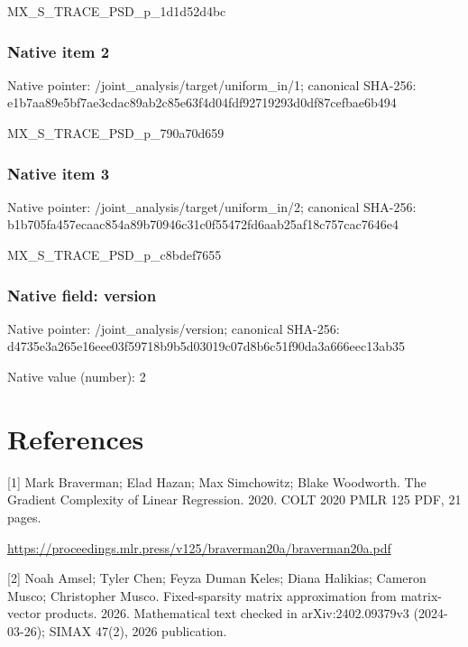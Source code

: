 \documentclass[10pt,a4paper]{article}
\begin{document}
\begingroup\raggedright\sloppy MX\_\allowbreak{}S\_\allowbreak{}TRACE\_\allowbreak{}PSD\_\allowbreak{}p\_\allowbreak{}1d1d52d4bc\par\endgroup

\subsubsection{Native item 2}
Native pointer: /joint\_\allowbreak{}analysis/target/uniform\_\allowbreak{}in/1; canonical SHA-256: e1b7aa89e5bf7ae3cdac89ab2c85e63f4d04fdf92719293d0df87cefbae6b494

\begingroup\raggedright\sloppy MX\_\allowbreak{}S\_\allowbreak{}TRACE\_\allowbreak{}PSD\_\allowbreak{}p\_\allowbreak{}790a70d659\par\endgroup

\subsubsection{Native item 3}
Native pointer: /joint\_\allowbreak{}analysis/target/uniform\_\allowbreak{}in/2; canonical SHA-256: b1b705fa457ecaac854a89b70946c31c0f55472fd6aab25af18c757cac7646e4

\begingroup\raggedright\sloppy MX\_\allowbreak{}S\_\allowbreak{}TRACE\_\allowbreak{}PSD\_\allowbreak{}p\_\allowbreak{}c8bdef7655\par\endgroup

\subsubsection{Native field: version}
Native pointer: /joint\_\allowbreak{}analysis/version; canonical SHA-256: d4735e3a265e16eee03f59718b9b5d03019c07d8b6c51f90da3a666eec13ab35

Native value (number): 2

\section{References}
[1] Mark Braverman; Elad Hazan; Max Simchowitz; Blake Woodworth. The Gradient Complexity of Linear Regression. 2020. COLT 2020 PMLR 125 PDF, 21 pages.

\url{https://proceedings.mlr.press/v125/braverman20a/braverman20a.pdf}

[2] Noah Amsel; Tyler Chen; Feyza Duman Keles; Diana Halikias; Cameron Musco; Christopher Musco. Fixed-sparsity matrix approximation from matrix-vector products. 2026. Mathematical text checked in arXiv:2402.09379v3 (2024-03-26); SIMAX 47(2), 2026 publication.
\end{document}
